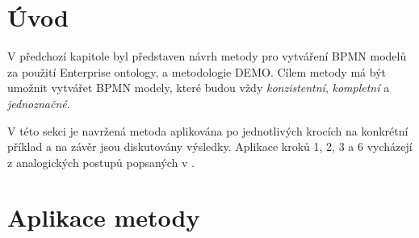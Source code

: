 \section{Úvod}
V předchozí kapitole byl představen návrh metody pro vytváření BPMN modelů za použití Enterprise ontology, \ptheory a metodologie DEMO. Cílem metody má být umožnit vytvářet BPMN modely, které budou vždy \textit{konzistentní}, \textit{kompletní} a \textit{jednoznačné}.

V této sekci je navržená metoda aplikována po jednotlivých krocích na konkrétní příklad a na závěr jsou diskutovány výsledky. Aplikace kroků 1, 2, 3 a 6 vycházejí z analogických postupů popsaných v \cite{Dietz2006}.

\section{Aplikace metody}
